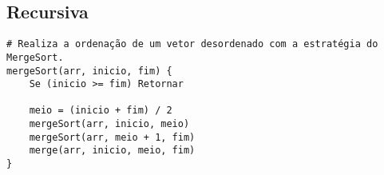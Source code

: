 \subsection{Recursiva}
\begin{verbatim}
# Realiza a ordenação de um vetor desordenado com a estratégia do MergeSort.
mergeSort(arr, inicio, fim) {
    Se (inicio >= fim) Retornar

    meio = (inicio + fim) / 2
    mergeSort(arr, inicio, meio)
    mergeSort(arr, meio + 1, fim)
    merge(arr, inicio, meio, fim)
}

\end{verbatim}
